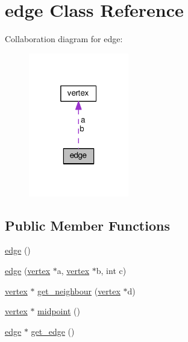 \hypertarget{classedge}{}\section{edge Class Reference}
\label{classedge}


Collaboration diagram for edge\+:
\nopagebreak
\begin{figure}[H]
\begin{center}
\leavevmode
\includegraphics[width=124pt]{classedge__coll__graph}
\end{center}
\end{figure}
\subsection*{Public Member Functions}
\begin{DoxyCompactItemize}
\item 
\hyperlink{classedge_ac8047a0d7c1e08a4063be409c6fd0a88}{edge} ()
\item 
\hyperlink{classedge_ac18a14c98d747852a75b022fc8bb2588}{edge} (\hyperlink{classvertex}{vertex} $\ast$a, \hyperlink{classvertex}{vertex} $\ast$b, int c)
\item 
\hyperlink{classvertex}{vertex} $\ast$ \hyperlink{classedge_a94884123402ed9847db2262603946728}{get\+\_\+neighbour} (\hyperlink{classvertex}{vertex} $\ast$d)
\item 
\hyperlink{classvertex}{vertex} $\ast$ \hyperlink{classedge_a5624f749846113812f2e7b58e60d0b05}{midpoint} ()
\item 
\hyperlink{classedge}{edge} $\ast$ \hyperlink{classedge_aec9e483e97c42b20838ff0b787026801}{get\+\_\+edge} ()
\end{DoxyCompactItemize}
